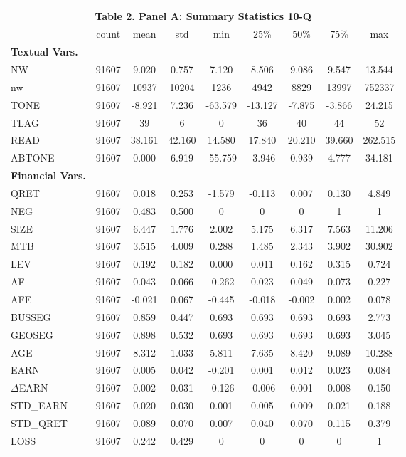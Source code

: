 \begin{table}[htbp] \label{T2PA}
  \centering
    \begin{tabular}{lcccccccc}
    \multicolumn{9}{c}{\textbf{Table 2. Panel A: Summary Statistics 10-Q}} \\
    \midrule
    \midrule
      & count & mean & std & min & 25\% & 50\% & 75\% & max \\
    \midrule
    \textbf{Textual Vars.} &   &   &   &   &   &   &   &  \\
    NW & 91607 & 9.020 & 0.757 & 7.120 & 8.506 & 9.086 & 9.547 & 13.544 \\
    nw & 91607 & 10937 & 10204 & 1236 & 4942 & 8829 & 13997 & 752337 \\
    TONE & 91607 & -8.921 & 7.236 & -63.579 & -13.127 & -7.875 & -3.866 & 24.215 \\
    TLAG & 91607 & 39 & 6 & 0 & 36 & 40 & 44 & 52 \\
    READ & 91607 & 38.161 & 42.160 & 14.580 & 17.840 & 20.210 & 39.660 & 262.515 \\
    ABTONE & 91607 & 0.000 & 6.919 & -55.759 & -3.946 & 0.939 & 4.777 & 34.181 \\
    \textbf{Financial Vars.} &   &   &   &   &   &   &   &  \\
    QRET & 91607 & 0.018 & 0.253 & -1.579 & -0.113 & 0.007 & 0.130 & 4.849 \\
    NEG & 91607 & 0.483 & 0.500 & 0 & 0 & 0 & 1 & 1 \\
    SIZE & 91607 & 6.447 & 1.776 & 2.002 & 5.175 & 6.317 & 7.563 & 11.206 \\
    MTB & 91607 & 3.515 & 4.009 & 0.288 & 1.485 & 2.343 & 3.902 & 30.902 \\
    LEV & 91607 & 0.192 & 0.182 & 0.000 & 0.011 & 0.162 & 0.315 & 0.724 \\
    AF & 91607 & 0.043 & 0.066 & -0.262 & 0.023 & 0.049 & 0.073 & 0.227 \\
    AFE & 91607 & -0.021 & 0.067 & -0.445 & -0.018 & -0.002 & 0.002 & 0.078 \\
    BUSSEG & 91607 & 0.859 & 0.447 & 0.693 & 0.693 & 0.693 & 0.693 & 2.773 \\
    GEOSEG & 91607 & 0.898 & 0.532 & 0.693 & 0.693 & 0.693 & 0.693 & 3.045 \\
    AGE & 91607 & 8.312 & 1.033 & 5.811 & 7.635 & 8.420 & 9.089 & 10.288 \\
    EARN & 91607 & 0.005 & 0.042 & -0.201 & 0.001 & 0.012 & 0.023 & 0.084 \\
    $\Delta$EARN & 91607 & 0.002 & 0.031 & -0.126 & -0.006 & 0.001 & 0.008 & 0.150 \\
    STD\_EARN & 91607 & 0.020 & 0.030 & 0.001 & 0.005 & 0.009 & 0.021 & 0.188 \\
    STD\_QRET & 91607 & 0.089 & 0.070 & 0.007 & 0.040 & 0.070 & 0.115 & 0.379 \\
    LOSS & 91607 & 0.242 & 0.429 & 0 & 0 & 0 & 0 & 1 \\
    \bottomrule
    \bottomrule
    \end{tabular}%
\end{table}%
